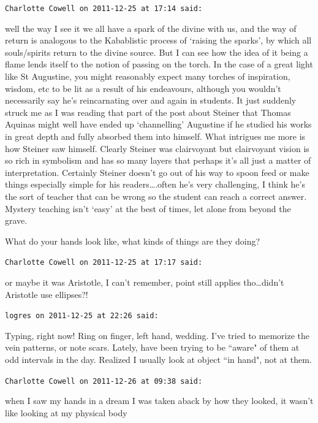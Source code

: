 \begin{footnotesize}
\begin{sffamily}
\hfill

\texttt{Charlotte Cowell on 2011-12-25 at 17:14 said: }

well the way I see it we all have a spark of the divine with us, and the way of return is analogous to the Kabablistic process of `raising the sparks', by which all souls/spirits return to the divine source. But I can see how the idea of it being a flame lends itself to the notion of passing on the torch. In the case of a great light like St Augustine, you might reasonably expect many torches of inspiration, wisdom, etc to be lit as a result of his endeavours, although you wouldn't necessarily say he's reincarnating over and again in students. It just suddenly struck me as I was reading that part of the post about Steiner that Thomas Aquinas might well have ended up `channelling' Augustine if he studied his works in great depth and fully absorbed them into himself. What intrigues me more is how Steiner saw himself. Clearly Steiner was clairvoyant but clairvoyant vision is so rich in symbolism and has so many layers that perhaps it's all just a matter of interpretation. Certainly Steiner doesn't go out of his way to spoon feed or make things especially simple for his readers….often he's very challenging, I think he's the sort of teacher that can be wrong so the student can reach a correct answer. Mystery teaching isn't `easy' at the best of times, let alone from beyond the grave. 

What do your hands look like, what kinds of things are they doing?


\hfill

\texttt{Charlotte Cowell on 2011-12-25 at 17:17 said: }

or maybe it was Aristotle, I can't remember, point still applies tho…didn't Aristotle use ellipses?!


\hfill

\texttt{logres on 2011-12-25 at 22:26 said: }

Typing, right now! Ring on finger, left hand, wedding. I've tried to memorize the vein patterns, or note scars. Lately, have been trying to be ``aware" of them at odd intervals in the day. Realized I usually look at object ``in hand", not at them.


\hfill

\texttt{Charlotte Cowell on 2011-12-26 at 09:38 said: }

when I saw my hands in a dream I was taken aback by how they looked, it wasn't like looking at my physical body



\end{sffamily}
\end{footnotesize}
